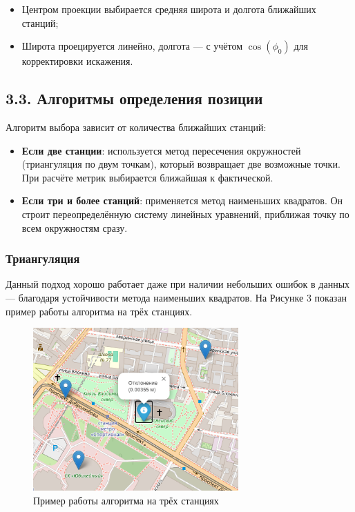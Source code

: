 \documentclass[a4paper,14pt]{extarticle}
\begin{document}
\begin{itemize}
    \begin{itemize}
        \item Центром проекции выбирается средняя широта и долгота ближайших станций;
        \item Широта проецируется линейно, долгота — с учётом \(\cos(\phi_0)\) для корректировки искажения.
    \end{itemize}

    \subsection*{3.3. Алгоритмы определения позиции}

    Алгоритм выбора зависит от количества ближайших станций:

    \begin{itemize}
        \item \textbf{Если две станции}: используется метод пересечения окружностей (триангуляция по двум точкам),
        который возвращает две возможные точки. При расчёте метрик выбирается ближайшая к фактической.
        \item \textbf{Если три и более станций}: применяется метод наименьших квадратов.
        Он строит переопределённую систему линейных уравнений, приближая точку по всем окружностям сразу.
    \end{itemize}

    \subsubsection*{Триангуляция}

    Данный подход хорошо работает даже при наличии небольших ошибок в данных
    — благодаря устойчивости метода наименьших квадратов. На Рисунке 3 показан пример работы
    алгоритма на трёх станциях.
    \begin{figure}[H]
        \centering
        \includegraphics[width=0.7\textwidth]{triangulation.png}
        \caption{Пример работы алгоритма на трёх станциях}
        \label{fig:triangulation_example}
    \end{figure}


\end{itemize}
\end{document}
